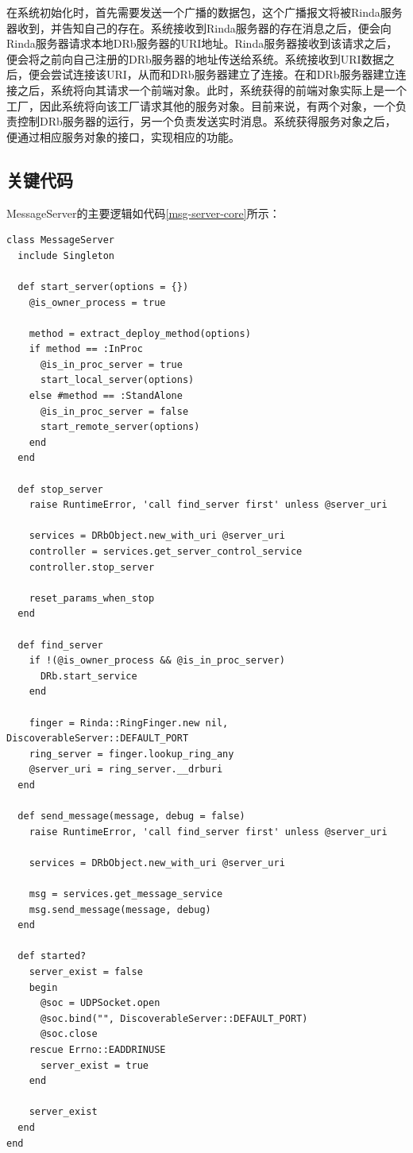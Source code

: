 在系统初始化时，首先需要发送一个广播的数据包，这个广播报文将被Rinda服务器收到，并告知自己的存在。系统接收到Rinda服务器的存在消息之后，便会向Rinda服务器请求本地DRb服务器的URI地址。Rinda服务器接收到该请求之后，便会将之前向自己注册的DRb服务器的地址传送给系统。系统接收到URI数据之后，便会尝试连接该URI，从而和DRb服务器建立了连接。在和DRb服务器建立连接之后，系统将向其请求一个前端对象。此时，系统获得的前端对象实际上是一个工厂，因此系统将向该工厂请求其他的服务对象。目前来说，有两个对象，一个负责控制DRb服务器的运行，另一个负责发送实时消息。系统获得服务对象之后，便通过相应服务对象的接口，实现相应的功能。


\subsection{关键代码}
MessageServer的主要逻辑如代码\ref{msg-server-core}所示：
\begin{lstlisting}[caption={MessageServer核心代码展示}, label=msg-server-core]
class MessageServer
  include Singleton

  def start_server(options = {})
    @is_owner_process = true

    method = extract_deploy_method(options)
    if method == :InProc
      @is_in_proc_server = true
      start_local_server(options)
    else #method == :StandAlone
      @is_in_proc_server = false
      start_remote_server(options)
    end
  end

  def stop_server
    raise RuntimeError, 'call find_server first' unless @server_uri

    services = DRbObject.new_with_uri @server_uri
    controller = services.get_server_control_service
    controller.stop_server

    reset_params_when_stop
  end

  def find_server
    if !(@is_owner_process && @is_in_proc_server)
      DRb.start_service 
    end

    finger = Rinda::RingFinger.new nil, DiscoverableServer::DEFAULT_PORT
    ring_server = finger.lookup_ring_any
    @server_uri = ring_server.__drburi
  end

  def send_message(message, debug = false)
    raise RuntimeError, 'call find_server first' unless @server_uri

    services = DRbObject.new_with_uri @server_uri
    
    msg = services.get_message_service
    msg.send_message(message, debug)
  end

  def started?
    server_exist = false
    begin
      @soc = UDPSocket.open
      @soc.bind("", DiscoverableServer::DEFAULT_PORT)
      @soc.close
    rescue Errno::EADDRINUSE
      server_exist = true
    end

    server_exist
  end
end
\end{lstlisting}


